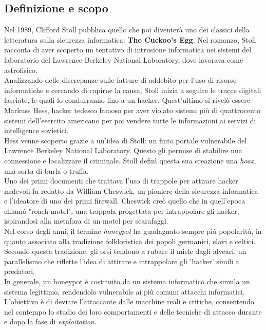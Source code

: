 \documentclass[12pt,a4paper,oneside,onecolumn,openright]{book}
\begin{document}
\subsection{Definizione e scopo}
Nel 1989, Clifford Stoll pubblica quello che poi diventerà uno dei classici della 
letteratura sulla sicurezza informatica: \textbf{The Cuckoo's Egg}. 
Nel romanzo, Stoll racconta di aver scoperto un tentativo di intrusione informatica 
nei sistemi del laboratorio del Lawrence Berkeley National Laboratory, 
dove lavorava come astrofisico.\\
Analizzando delle discrepanze sulle fatture di addebito per l'uso di risorse informatiche 
e cercando di capirne la causa, Stoll inizia a seguire le tracce digitali lasciate, 
le quali lo condurranno fino a un hacker. Quest'ultimo si rivelò essere Markuss Hess, 
hacker tedesco famoso per aver violato sistemi più di quattrocento sistemi dell'esercito 
americano per poi vendere tutte le informazioni ai servizi di intelligence sovietici.\\
Hess venne scoperto grazie a un'idea di Stoll: un finto portale vulnerabile del 
Lawrence Berkeley National Laboratory. Questo gli permise di stabilire una connessione 
e localizzare il criminale. Stoll definì questa sua creazione una \textit{hoax}, 
una sorta di burla o truffa.\\
Uno dei primi documenti che trattava l'uso di trappole per attirare hacker malevoli 
fu redatto da William Cheswick, un pioniere della sicurezza informatica e l'ideatore di 
uno dei primi firewall. Cheswick creò quello che in quell'epoca chiamò "roach motel", 
una trappola progettata per intrappolare gli hacker, ispirandosi alla metafora di un 
motel per scarafaggi.\\
Nel corso degli anni, il termine \textit{honeypot} ha guadagnato sempre più popolarità, 
in quanto associato alla tradizione folkloristica dei popoli germanici, 
slavi e celtici. Secondo questa tradizione, gli orsi tendono a rubare il miele dagli 
alveari, un parallelismo che riflette l'idea di attirare e intrappolare gli 'hacker' 
simili a predatori.\\
In generale, un honeypot è costituito da un sistema informatico che simula un 
sistema legittimo, rendendolo vulnerabile ai più comuni attacchi informatici. 
L'obiettivo è di deviare l'attaccante dalle macchine reali e critiche, consentendo 
nel contempo lo studio dei loro comportamenti e delle tecniche di attacco durante e 
dopo la fase di \textit{exploitation}.\\
\end{document}
